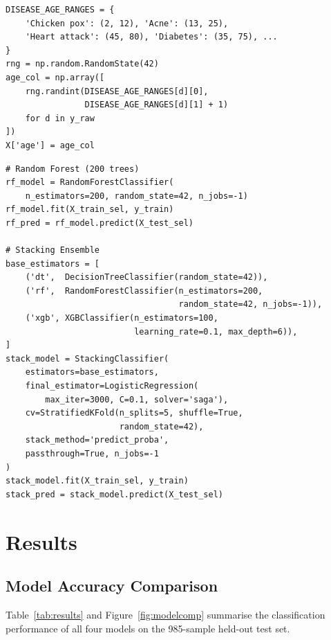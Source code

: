 \documentclass[12pt,a4paper]{article}
\begin{document}
\begin{lstlisting}[caption=Age Feature Generation]
DISEASE_AGE_RANGES = {
    'Chicken pox': (2, 12), 'Acne': (13, 25),
    'Heart attack': (45, 80), 'Diabetes': (35, 75), ...
}
rng = np.random.RandomState(42)
age_col = np.array([
    rng.randint(DISEASE_AGE_RANGES[d][0],
                DISEASE_AGE_RANGES[d][1] + 1)
    for d in y_raw
])
X['age'] = age_col
\end{lstlisting}

\begin{lstlisting}[caption=Random Forest and Stacking Ensemble Training]
# Random Forest (200 trees)
rf_model = RandomForestClassifier(
    n_estimators=200, random_state=42, n_jobs=-1)
rf_model.fit(X_train_sel, y_train)
rf_pred = rf_model.predict(X_test_sel)

# Stacking Ensemble
base_estimators = [
    ('dt',  DecisionTreeClassifier(random_state=42)),
    ('rf',  RandomForestClassifier(n_estimators=200,
                                   random_state=42, n_jobs=-1)),
    ('xgb', XGBClassifier(n_estimators=100,
                          learning_rate=0.1, max_depth=6)),
]
stack_model = StackingClassifier(
    estimators=base_estimators,
    final_estimator=LogisticRegression(
        max_iter=3000, C=0.1, solver='saga'),
    cv=StratifiedKFold(n_splits=5, shuffle=True,
                       random_state=42),
    stack_method='predict_proba',
    passthrough=True, n_jobs=-1
)
stack_model.fit(X_train_sel, y_train)
stack_pred = stack_model.predict(X_test_sel)
\end{lstlisting}

\section{Results}
\label{sec:results}

\subsection{Model Accuracy Comparison}

Table~\ref{tab:results} and Figure~\ref{fig:modelcomp} summarise the classification
performance of all four models on the 985-sample held-out test set.
\end{document}
